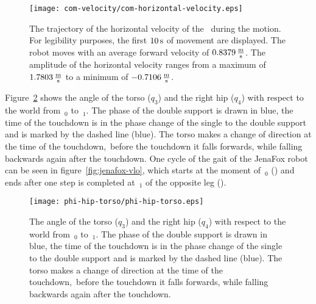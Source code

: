 \begin{figure}[htb]%
    \centering%
    \texttt{[image: com-velocity/com-horizontal-velocity.eps]}
    \caption{The trajectory of the horizontal velocity of the~ during the motion. For legibility purposes, the first $10\,\textrm{\si{\second}}$ of movement are displayed. The robot moves with an average forward velocity of $0.8379\,\textrm{\si{\metre\per\second}}$. The amplitude of the horizontal velocity ranges from a maximum of $1.7803\,\textrm{\si{\metre\per\second}}$ to a minimum of $-0.7106\,\textrm{\si{\metre\per\second}}$.}%
    \label{fig:com-horizontal-velocity}%
\end{figure}%

Figure~\ref{fig:phi-hip-torso} shows the angle of the torso ($q_{3}$) and the right hip ($q_{4}$) with respect to the world from~$_0$ to~$_1$. The phase of the double support is drawn in blue, the time of the touchdown is in the phase change of the single to the double support and is marked by the dashed line (blue). The torso makes a change of direction at the time of the touchdown,~\ie before the touchdown it falls forwards, while falling backwards again after the touchdown. One cycle of the gait of the JenaFox robot can be seen in figure~\ref{fig:jenafox-vlo}, which starts at the moment of~$_{0}$ () and ends after one step is completed at~$_{1}$ of the opposite leg ().

\begin{figure}[H]%
    \centering%
    \texttt{[image: phi-hip-torso/phi-hip-torso.eps]}
    \caption{The angle of the torso ($q_{3}$) and the right hip ($q_{4}$) with respect to the world from~$_0$ to~$_1$. The phase of the double support is drawn in blue, the time of the touchdown is in the phase change of the single to the double support and is marked by the dashed line (blue). The torso makes a change of direction at the time of the touchdown,~\ie before the touchdown it falls forwards, while falling backwards again after the touchdown.}%
    \label{fig:phi-hip-torso}%
\end{figure}%

